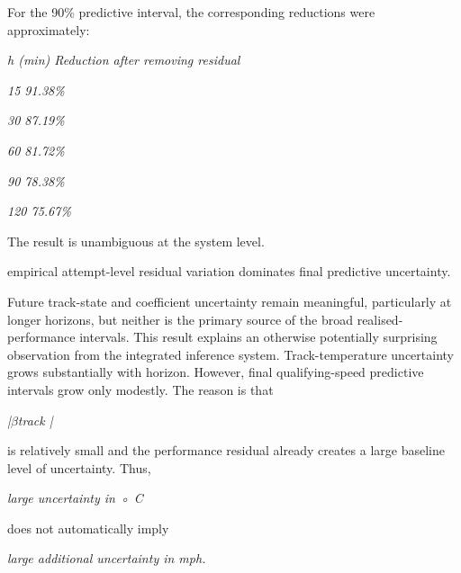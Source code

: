 For the 90\% predictive interval, the corresponding reductions were approximately:

\begin{center}\textit{h (min)    Reduction after removing residual}\end{center}

\begin{center}\textit{15                   91.38\%}\end{center}

\begin{center}\textit{30                   87.19\%}\end{center}

\begin{center}\textit{60                   81.72\%}\end{center}

\begin{center}\textit{90                   78.38\%}\end{center}

\begin{center}\textit{120                   75.67\%}\end{center}

The result is unambiguous at the system level.

empirical attempt-level residual variation dominates final predictive uncertainty.

Future track-state and coefficient uncertainty remain meaningful, particularly at longer horizons, but neither is the primary source of the broad realised-performance intervals. This result explains an otherwise potentially surprising observation from the integrated inference system. Track-temperature uncertainty grows substantially with horizon. However, final qualifying-speed predictive intervals grow only modestly. The reason is that

\begin{center}\textit{|\ensuremath{\beta}track |}\end{center}

is relatively small and the performance residual already creates a large baseline level of uncertainty. Thus,

\begin{center}\textit{large uncertainty in ◦ C}\end{center}

does not automatically imply

\begin{center}\textit{large additional uncertainty in mph.}\end{center}

